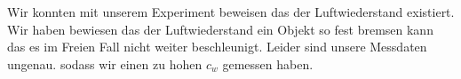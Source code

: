 Wir konnten mit unserem Experiment beweisen das der Luftwiederstand existiert. Wir haben bewiesen das der Luftwiederstand ein Objekt so fest bremsen kann das es im Freien Fall nicht weiter beschleunigt. Leider sind unsere Messdaten ungenau. sodass wir einen zu hohen $c_w$ gemessen haben. 